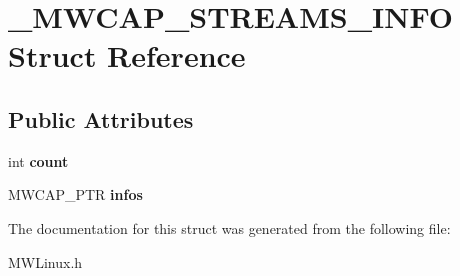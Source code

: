 \hypertarget{struct__MWCAP__STREAMS__INFO}{\section{\-\_\-\-M\-W\-C\-A\-P\-\_\-\-S\-T\-R\-E\-A\-M\-S\-\_\-\-I\-N\-F\-O Struct Reference}
\label{struct__MWCAP__STREAMS__INFO}
}
\subsection*{Public Attributes}
\begin{DoxyCompactItemize}
\item 
\hypertarget{struct__MWCAP__STREAMS__INFO_a5b2df6bb7a8aa3140e9e4495482bac52}{int {\bfseries count}}\label{struct__MWCAP__STREAMS__INFO_a5b2df6bb7a8aa3140e9e4495482bac52}

\item 
\hypertarget{struct__MWCAP__STREAMS__INFO_af5884292ff4d19a206abffed9349728e}{M\-W\-C\-A\-P\-\_\-\-P\-T\-R {\bfseries infos}}\label{struct__MWCAP__STREAMS__INFO_af5884292ff4d19a206abffed9349728e}

\end{DoxyCompactItemize}


The documentation for this struct was generated from the following file\-:\begin{DoxyCompactItemize}
\item 
M\-W\-Linux.\-h\end{DoxyCompactItemize}
